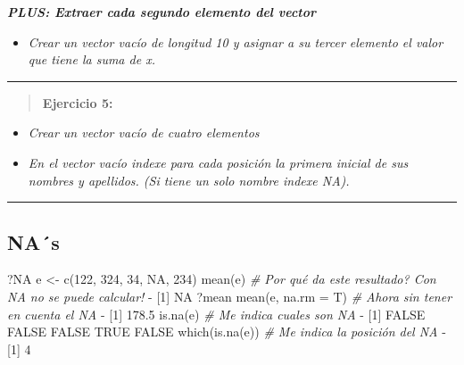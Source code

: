 \documentclass[
]{book}
\newenvironment{Shaded}{\begin{snugshade}}{\end{snugshade}}
\newcommand{\AttributeTok}[1]{\textcolor[rgb]{0.77,0.63,0.00}{#1}}
\newcommand{\CommentTok}[1]{\textcolor[rgb]{0.56,0.35,0.01}{\textit{#1}}}
\newcommand{\ConstantTok}[1]{\textcolor[rgb]{0.00,0.00,0.00}{#1}}
\newcommand{\DecValTok}[1]{\textcolor[rgb]{0.00,0.00,0.81}{#1}}
\newcommand{\FloatTok}[1]{\textcolor[rgb]{0.00,0.00,0.81}{#1}}
\newcommand{\FunctionTok}[1]{\textcolor[rgb]{0.00,0.00,0.00}{#1}}
\newcommand{\NormalTok}[1]{#1}
\newcommand{\OtherTok}[1]{\textcolor[rgb]{0.56,0.35,0.01}{#1}}
\newcommand{\SpecialCharTok}[1]{\textcolor[rgb]{0.00,0.00,0.00}{#1}}
\providecommand{\tightlist}{%
  \setlength{\itemsep}{0pt}\setlength{\parskip}{0pt}}
\begin{document}
\textbf{\emph{PLUS: Extraer cada segundo elemento del vector}}

\begin{itemize}
\tightlist
\item
  \emph{Crear un vector vacío de longitud 10 y asignar a su tercer elemento el valor que tiene la suma de x.}
\end{itemize}

\begin{center}\rule{0.5\linewidth}{0.5pt}\end{center}

\begin{quote}
\textbf{Ejercicio 5:}
\end{quote}

\begin{itemize}
\item
  \emph{Crear un vector vacío de cuatro elementos}
\item
  \emph{En el vector vacío indexe para cada posición la primera inicial de sus nombres y apellidos. (Si tiene un solo nombre indexe NA).}
\end{itemize}

\begin{center}\rule{0.5\linewidth}{0.5pt}\end{center}

\hypertarget{nas}{%
\subsection{NA´s}\label{nas}}

\begin{Shaded}
\begin{Highlighting}[]
\NormalTok{?}\ConstantTok{NA}
\NormalTok{e }\OtherTok{\textless{}{-}} \FunctionTok{c}\NormalTok{(}\DecValTok{122}\NormalTok{, }\DecValTok{324}\NormalTok{, }\DecValTok{34}\NormalTok{, }\ConstantTok{NA}\NormalTok{, }\DecValTok{234}\NormalTok{) }
\FunctionTok{mean}\NormalTok{(e) }\CommentTok{\# Por qué da este resultado? Con NA no se puede calcular!}
\SpecialCharTok{{-}}\NormalTok{ [}\DecValTok{1}\NormalTok{] }\ConstantTok{NA}
\NormalTok{?mean}
\FunctionTok{mean}\NormalTok{(e, }\AttributeTok{na.rm =}\NormalTok{ T) }\CommentTok{\# Ahora sin tener en cuenta el NA}
\SpecialCharTok{{-}}\NormalTok{ [}\DecValTok{1}\NormalTok{] }\FloatTok{178.5}
\FunctionTok{is.na}\NormalTok{(e)        }\CommentTok{\# Me indica cuales son NA}
\SpecialCharTok{{-}}\NormalTok{ [}\DecValTok{1}\NormalTok{] }\ConstantTok{FALSE} \ConstantTok{FALSE} \ConstantTok{FALSE}  \ConstantTok{TRUE} \ConstantTok{FALSE}
\FunctionTok{which}\NormalTok{(}\FunctionTok{is.na}\NormalTok{(e)) }\CommentTok{\# Me indica la posición del NA}
\SpecialCharTok{{-}}\NormalTok{ [}\DecValTok{1}\NormalTok{] }\DecValTok{4}
\end{Highlighting}
\end{Shaded}
\end{document}

